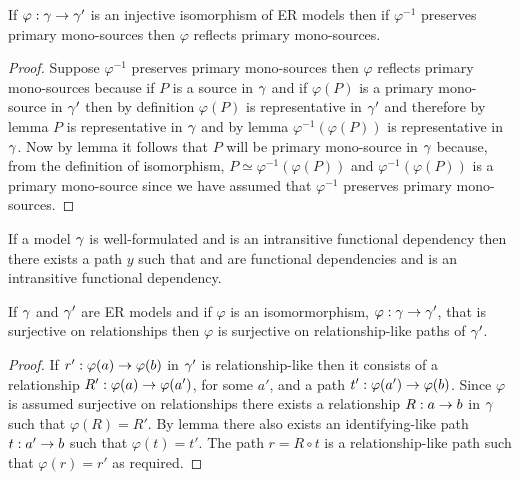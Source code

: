 \documentclass[10pt,a4paper]{scrartcl}
\begin{document}
\begin{lemma}
If $\varphi: \gamma \rightarrow \gamma'$ is an injective isomorphism of ER models  then
if $\varphi^{-1}$ preserves primary mono-sources
then $\varphi$ reflects primary mono-sources.
\end{lemma}
\begin{proof}
Suppose $\varphi^{-1}$ preserves primary mono-sources then $\varphi$ reflects primary mono-sources because
if $P$ is a source in $\gamma$ and if $\varphi(P)$ is a primary mono-source in $\gamma'$ then
by definition $\varphi(P)$ is representative in $\gamma'$ and therefore by lemma  
$P$ is representative in $\gamma$ and by lemma  $\varphi^{-1}(\varphi(P))$ is representative in $\gamma$.
Now by lemma  it follows that $P$ will be primary mono-source in $\gamma$ because, from the definition of
isomorphism,  $P \simeq \varphi^{-1}(\varphi(P))$ and $\varphi^{-1}(\varphi(P))$ is a primary mono-source since we have assumed
that  $\varphi^{-1}$ preserves primary mono-sources. 
\end{proof}

\begin{lemma}
If a model $\gamma$ is well-formulated and  is an intransitive functional dependency then there exists a path $y$
such that  and  are functional dependencies and  is an intransitive functional dependency.
\end{lemma}


\begin{lemma}
If $\gamma$ and $\gamma'$ are ER models and  if  $\varphi$ is an isomormorphism, $\varphi: \gamma \rightarrow \gamma'$, that is surjective on relationships    
then $\varphi$ is surjective on relationship-like paths of $\gamma'$. 
\end{lemma}
\begin{proof}
If $r':\varphi(a) \rightarrow \varphi(b)$ in $\gamma'$ is relationship-like then it consists of a relationship $R': \varphi(a) \rightarrow \varphi(a')$, for some $a'$,
and a path $t':\varphi(a') \rightarrow \varphi(b)$. Since $\varphi$ is assumed surjective on relationships there exists a relationship 
$R:a \rightarrow b$ in $\gamma$ such that $\varphi(R)=R'$. 
By lemma  there also exists an identifying-like path $t:a' \rightarrow b$ such that $\varphi(t)=t'$.
The path $r=R \circ t$ is a relationship-like path such that $\varphi(r)=r'$ as required.
\end{proof}
	 
\end{document}
